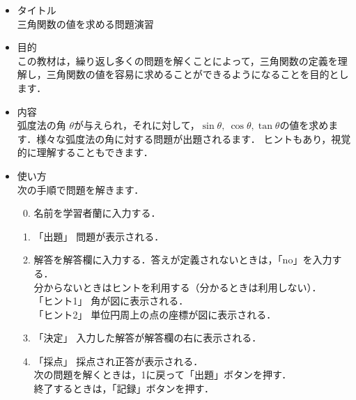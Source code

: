 \documentclass[20]{jarticle}
\begin{document}
\begin{itemize}
\item タイトル\\
三角関数の値を求める問題演習
\item 目的\\
この教材は，繰り返し多くの問題を解くことによって，三角関数の定義を理解し，三角関数の値を容易に求めることができるようになることを目的とします．
\item 内容\\
弧度法の角 $\theta $が与えられ，それに対して，$\sin \theta ,\ \cos \theta , \tan \theta $の値を求めます．様々な弧度法の角に対する問題が出題されるます．
ヒントもあり，視覚的に理解することもできます．


\item 使い方\\
次の手順で問題を解きます．
\begin{enumerate}
\setcounter{enumi}{-1}
\item 名前を学習者蘭に入力する．
\item 「出題」 問題が表示される．
\item 解答を解答欄に入力する．答えが定義されないときは，「no」を入力する．\\[1mm]
分からないときはヒントを利用する（分かるときは利用しない）．\\[1mm]
\hspace{1zw}「ヒント1」 角が図に表示される．\\[1mm]
\hspace{1zw}「ヒント2」 単位円周上の点の座標が図に表示される．
\item 「決定」 入力した解答が解答欄の右に表示される．
\item 「採点」 採点され正答が表示される．\\[1mm]
\hspace{2zw}次の問題を解くときは，1に戻って「出題」ボタンを押す．\\[1mm]
\hspace{2zw}終了するときは，「記録」ボタンを押す．


\end{enumerate}

\end{itemize}
\end{document}
